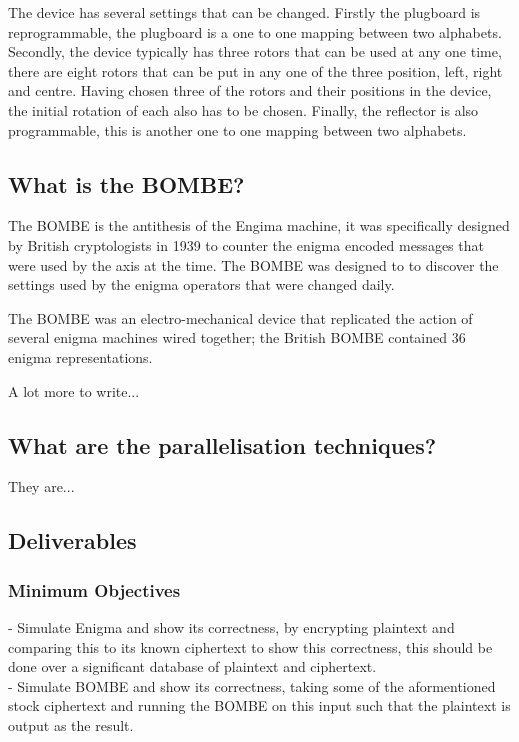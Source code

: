 \documentclass[12pt,a4paper]{article}
\begin{document}
The device has several settings that can be changed. Firstly the plugboard is reprogrammable, the plugboard is a one to one mapping between two alphabets. Secondly, the device typically has three rotors that can be used at any one time, there are eight rotors that can be put in any one of the three position, left, right and centre. Having chosen three of the rotors and their positions in the device, the initial rotation of each also has to be chosen. Finally, the reflector is also programmable, this is another one to one mapping between two alphabets.

\subsection{What is the BOMBE?}

The BOMBE is the antithesis of the Engima machine, it was specifically designed by British cryptologists in 1939 to counter the enigma encoded messages that were used by the axis at the time. The BOMBE was designed to to discover the settings used by the enigma operators that were changed daily. 

The BOMBE was an electro-mechanical device that replicated the action of several enigma machines wired together; the British BOMBE contained 36 enigma representations.

A lot more to write...

\subsection{What are the parallelisation techniques?}

They are...

\subsection{Deliverables}

\subsubsection{Minimum Objectives}

- Simulate Enigma and show its correctness, by encrypting plaintext and comparing this to its known ciphertext to show this correctness, this should be done over a significant database of plaintext and ciphertext.\\
- Simulate BOMBE and show its correctness, taking some of the aformentioned stock ciphertext and running the BOMBE on this input such that the plaintext is output as the result.
\end{document}
